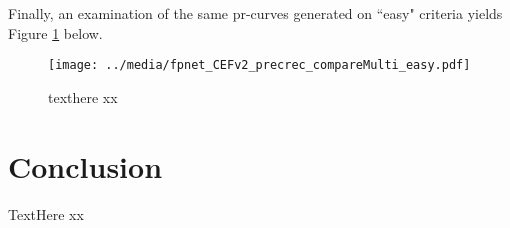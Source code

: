 Finally, an examination of the same pr-curves generated on ``easy" criteria yields Figure \ref{fpnet_CEFv2_precrec_compareMulti_easy} below.

\begin{figure}[H]
	\centering
	\texttt{[image: ../media/fpnet\_CEFv2\_precrec\_compareMulti\_easy.pdf]}
	\caption{texthere xx}
	\label{fpnet_CEFv2_precrec_compareMulti_easy}
\end{figure}

\newpage
\section{Conclusion}
TextHere xx
